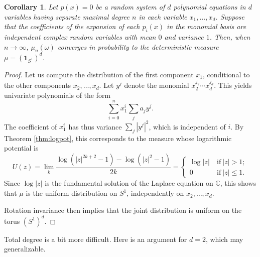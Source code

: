 \documentclass[12pt]{article}
\def\C{\mathbb{C}}
\def\bone{\boldsymbol{1}}
\newtheorem{corollary}{Corollary}[section]
\begin{document}
\begin{corollary}
    Let $p(x)=0$ be a random system of  $d$ polynomial equations in $d$ variables having separate maximal degree $n$ in each variable $x_1,\dots,x_d$. Suppose that the coefficients of the expansion of each $p_i(x)$ in the monomial basis are independent complex random variables with mean $0$ and variance $1$. Then, when $n \longrightarrow \infty$, $\mu_n(\omega)$ converges in probability to the deterministic measure $\mu = (\bone_{S^1})^d$.
\end{corollary}
\begin{proof}
    Let us compute the distribution of the first component $x_1$, conditional to the other components $x_2,\dots,x_d$. Let $y^j$ denote the monomial $x_2^{j_2} \cdots x_d^{j_d}$. This yields univariate polynomials of the form
    \[  \sum_{i=0}^n x_1^i \sum_{j} a_j y^j.\]
    The coefficient of $x_1^i$ has thus variance $\sum_j |y^j|^2$, which is independent of $i$. By Theorem \ref{thm:logpot}, this corresponds to the measure whose logarithmic potential is
    \[  U(z) = \lim_k \frac{\log(|z|^{2k+2}-1) - \log(|z|^2-1)}{2k} = \begin{cases}
        \log|z| \ &\mathrm{if} \ |z| > 1;\\
        0 \ &\mathrm{if} \ |z| \leq 1.
    \end{cases}   \]
Since $\log|z|$ is the fundamental solution of the Laplace equation on $\C$, this shows that $\mu$ is the uniform distribution on $S^1$, independently on $x_2,\dots,x_d$.

Rotation invariance then implies that the joint distribution is uniform on the torus $(S^1)^d$.
\end{proof}

Total degree is a bit more difficult. Here is an argument for $d=2$, which may generalizable.
\end{document}
